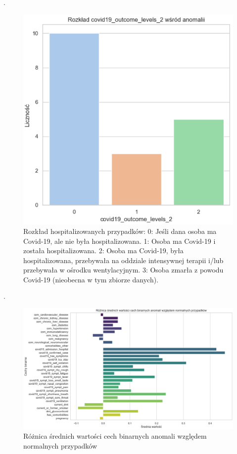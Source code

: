 \documentclass[a4paper,fleqn]{cas-dc}
\begin{document}
\newpage
.
\newpage
\begin{figure}[h]
	\includegraphics[scale=.80]{wykresy/wykres10.png}
	\caption{Rozkład hospitalizowanych przypadków: 0: Jeśli dana osoba ma Covid-19, ale nie była hospitalizowana.
1: Osoba ma Covid-19 i została hospitalizowana.
2: Osoba ma Covid-19, była hospitalizowana, przebywała na oddziale intensywnej terapii i/lub przebywała w ośrodku wentylacyjnym.
3: Osoba zmarła z powodu Covid-19 (nieobecna w tym zbiorze danych).}
	\label{FIG:1}
\end{figure}
\newpage
.
\newpage
\begin{figure}[h]
	\includegraphics[scale=.70]{wykresy/wykres11.png}
	\caption{Różnica średnich wartości cech binarnych anomali względem normalnych przypadków}
	\label{FIG:1}
\end{figure}
\end{document}
